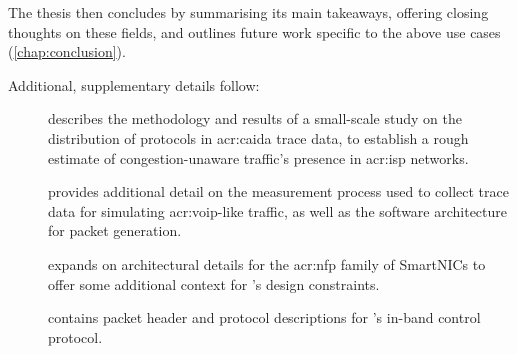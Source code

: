 The thesis then concludes by summarising its main takeaways, offering closing thoughts on these fields, and outlines future work specific to the above use cases (\cref{chap:conclusion}).

Additional, supplementary details follow:
\begin{description}
	\item[] describes the methodology and results of a small-scale study on the distribution of protocols in \gls{acr:caida} trace data, to establish a rough estimate of congestion-unaware traffic's presence in \gls{acr:isp} networks.
	\item[] provides additional detail on the measurement process used to collect trace data for simulating \gls{acr:voip}-like traffic, as well as the software architecture for packet generation.
	\item[] expands on architectural details for the \gls{acr:nfp} family of SmartNICs to offer some additional context for \approachshort{}'s design constraints.
	\item[] contains packet header and protocol descriptions for \approachshort{}'s in-band control protocol.
\end{description}